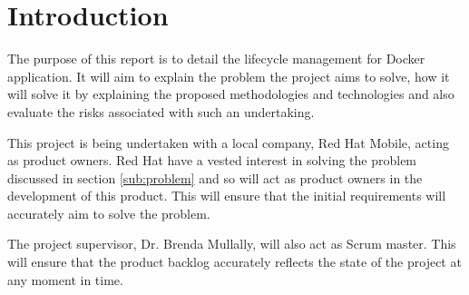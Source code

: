 \section{Introduction}
The purpose of this report is to detail the \gls{lifecycle management} for Docker application. It will aim to explain the problem the project aims to solve, how it will solve it by explaining the proposed methodologies and technologies and also evaluate the risks associated with such an undertaking. 

This project is being undertaken with a local company, Red Hat Mobile, acting as product owners. Red Hat have a vested interest in solving the problem discussed in section \ref{sub:problem} and so will act as product owners in the development of this product. This will ensure that the initial requirements will accurately aim to solve the problem. 

The project supervisor, Dr. Brenda Mullally, will also act as Scrum master. This will ensure that the product backlog accurately reflects the state of the project at any moment in time. 
